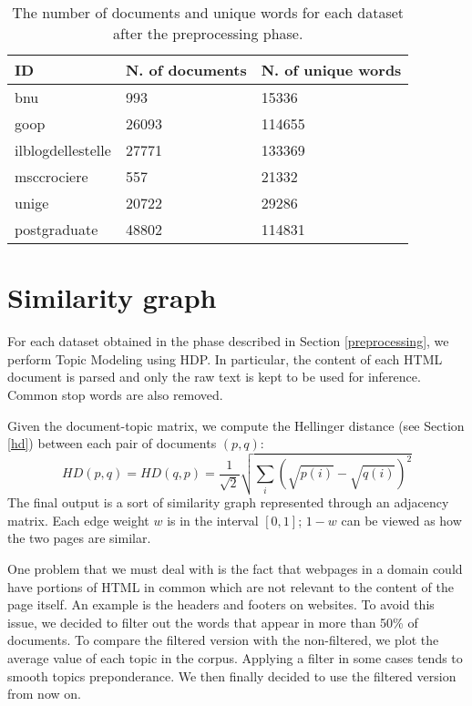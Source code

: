 \begin{table}[H]
    \begin{center}
        \begin{tabular}{ |l|l|l| }
            \hline
            ID                & N. of documents & N. of unique words \\
            \hline
            bnu               & 993             & 15336              \\
            \hline
            goop              & 26093           & 114655             \\
            \hline
            ilblogdellestelle & 27771           & 133369             \\
            \hline
            msccrociere       & 557             & 21332              \\
            \hline
            unige             & 20722           & 29286              \\
            \hline
            postgraduate      & 48802           & 114831             \\
            \hline
        \end{tabular}
    \end{center}
    \caption{
        The number of documents and unique words for each dataset after the preprocessing phase.
    }
    \label{table:dbprocdata}
\end{table}

\section{Similarity graph} \label{sgexp}
For each dataset obtained in the phase described in Section \ref{preprocessing},
we perform Topic Modeling using HDP. In particular, the content of each HTML document is
parsed and only the raw text is kept to be used for inference. Common stop words are also removed.

Given the document-topic matrix,
we compute the Hellinger distance (see Section \ref{hd}) between each pair of documents $(p, q)$:
\[\mathit{HD}(p, q) = \mathit{HD}(q, p) = \frac{1}{\sqrt{2}} \sqrt{\sum_i (\sqrt{p(i)} - \sqrt{q(i)})^2}\]
The final output is a sort of similarity graph represented through an adjacency matrix.
Each edge weight $w$ is in the interval $[0, 1]$;
$1-w$ can be viewed as how the two pages are similar.

One problem that we must deal with is the fact that
webpages in a domain could have portions of HTML in common which are not relevant to the content of the page itself.
An example is the headers and footers on websites.
To avoid this issue, we decided to filter out the words that appear in more than 50\% of documents.
To compare the filtered version with the non-filtered, we plot the average value of each topic in the corpus.
Applying a filter in some cases tends to smooth topics preponderance.
We then finally decided to use the filtered version from now on.

